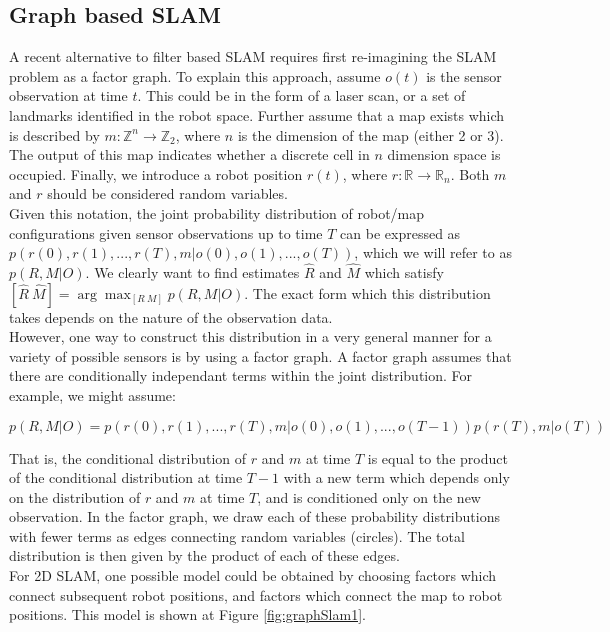 \documentclass[capstone_report.tex]{subfiles}
\begin{document}
\subsection{Graph based SLAM}
A recent alternative to filter based SLAM requires first re-imagining the SLAM problem as a factor graph. To explain this approach, assume $o(t)$ is the sensor observation at time $t$. This could be in the form of a laser scan, or a set of landmarks identified in the robot space. Further assume that a map exists which is described by $m:\mathbb Z^n\to\mathbb Z_2$, where $n$ is the dimension of the map (either 2 or 3). The output of this map indicates whether a discrete cell in $n$ dimension space is occupied. Finally, we introduce a robot position $r(t)$, where $r:\mathbb R\to\mathbb R_n$. Both $m$ and $r$ should be considered random variables.\\

Given this notation, the joint probability distribution of robot/map configurations given sensor observations up to time $T$ can be expressed as $p(r(0), r(1), ... , r(T), m | o(0), o(1), ... , o(T))$, which we will refer to as $p(R,M|O)$. We clearly want to find estimates $\hat{R}$ and $\hat{M}$ which satisfy $[\hat{R} \ \hat{M}] = \arg \max_{[R \  M]} p(R,M|O)$. The exact form which this distribution takes depends on the nature of the observation data.\\

However, one way to construct this distribution in a very general manner for a variety of possible sensors is by using a factor graph. A factor graph assumes that there are conditionally independant terms within the joint distribution. For example, we might assume:

\[
  p(R,M|O)= p(r(0), r(1), ... , r(T), m | o(0), o(1), ... , o(T-1))p(r(T), m | o(T))
\]

That is, the conditional distribution of $r$ and $m$ at time $T$ is equal to the product of the conditional distribution at time $T-1$ with a new term which depends only on the distribution of $r$ and $m$ at time $T$, and is conditioned only on the new observation. In the factor graph, we draw each of these probability distributions with fewer terms as edges connecting random variables (circles). The total distribution is then given by the product of each of these edges.\\ 

For 2D SLAM, one possible model could be obtained by choosing factors which connect subsequent robot positions, and factors which connect the map to robot positions. This model is shown at Figure \ref{fig:graphSlam1}.
\end{document}
